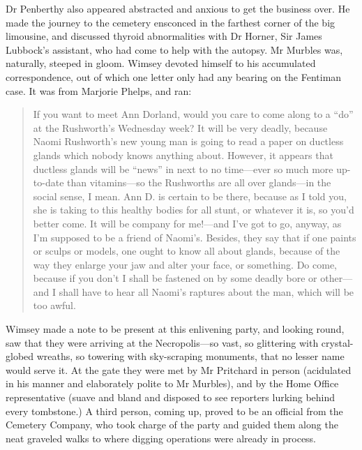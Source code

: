 Dr Penberthy also appeared abstracted and anxious to get the business over. He made the journey to the cemetery ensconced in the farthest corner of the big limousine, and discussed thyroid abnormalities with Dr Horner, Sir James Lubbock's assistant, who had come to help with the autopsy. Mr Murbles was, naturally, steeped in gloom. Wimsey devoted himself to his accumulated correspondence, out of which one letter only had any bearing on the Fentiman case. It was from Marjorie Phelps, and ran:

\begin{quote}If you want to meet Ann Dorland, would you care to come along to a \enquote{do} at the Rushworth's Wednesday week? It will be very deadly, because Naomi Rushworth's new young man is going to read a paper on ductless glands which nobody knows anything about. However, it appears that ductless glands will be \enquote{news} in next to no time\allowbreak---\allowbreak ever so much more up-to-date than vitamins\allowbreak---\allowbreak so the Rushworths are all over glands\allowbreak---\allowbreak in the social sense, I mean. Ann D. is certain to be there, because as I told you, she is taking to this healthy bodies for all stunt, or whatever it is, so you'd better come. It will be company for me!---and I've got to go, anyway, as I'm supposed to be a friend of Naomi's. Besides, they say that if one paints or sculps or models, one ought to know all about glands, because of the way they enlarge your jaw and alter your face, or something. Do come, because if you don't I shall be fastened on by some deadly bore or other\allowbreak---\allowbreak and I shall have to hear all Naomi's raptures about the man, which will be too awful.
\end{quote}

Wimsey made a note to be present at this enlivening party, and looking round, saw that they were arriving at the Necropolis\allowbreak---\allowbreak so vast, so glittering with crystal-globed wreaths, so towering with sky-scraping monuments, that no lesser name would serve it. At the gate they were met by Mr Pritchard in person (acidulated in his manner and elaborately polite to Mr Murbles), and by the Home Office representative (suave and bland and disposed to see reporters lurking behind every tombstone.) A third person, coming up, proved to be an official from the Cemetery Company, who took charge of the party and guided them along the neat graveled walks to where digging operations were already in process.

